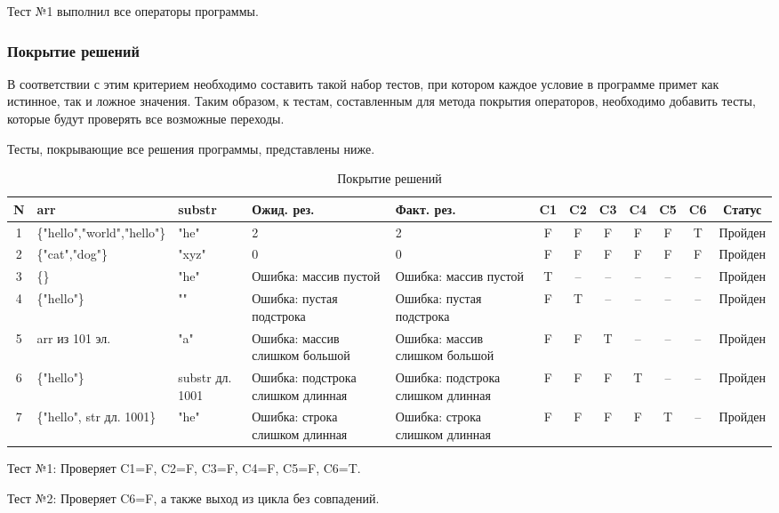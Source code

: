 \documentclass{article}[14pt]
\begin{document}
Тест №1 выполнил все операторы программы.

\subsubsection{Покрытие решений}

В соответствии с этим критерием необходимо составить такой набор тестов, при
котором каждое условие в программе примет как истинное, так и ложное значения.
Таким образом, к тестам, составленным для метода покрытия операторов, необходимо добавить тесты, которые будут проверять все возможные переходы.

Тесты, покрывающие все решения программы, представлены ниже.

\begin{table}[h!]
\centering
\caption{Покрытие решений}
\begin{tabularx}{\textwidth}{|c|X|X|X|X|c|c|c|c|c|c|c|}
\hline
\textbf{N} & \textbf{arr} & \textbf{substr} & \textbf{Ожид. рез.} & \textbf{Факт. рез.} & \textbf{C1} & \textbf{C2} & \textbf{C3} & \textbf{C4} & \textbf{C5} & \textbf{C6} & \textbf{Статус} \\
\hline
1 & \{"hello","world","hello"\} & "he" & 2 & 2 & F & F & F & F & F & T & Пройден \\
\hline
2 & \{"cat","dog"\} & "xyz" & 0 & 0 & F & F & F & F & F & F & Пройден \\
\hline
3 & \{\} & "he" & Ошибка: массив пустой & Ошибка: массив пустой & T & -- & -- & -- & -- & -- & Пройден \\
\hline
4 & \{"hello"\} & "" & Ошибка: пустая подстрока & Ошибка: пустая подстрока & F & T & -- & -- & -- & -- & Пройден \\
\hline
5 & arr из 101 эл. & "a" & Ошибка: массив слишком большой & Ошибка: массив слишком большой & F & F & T & -- & -- & -- & Пройден \\
\hline
6 & \{"hello"\} & substr дл. 1001 & Ошибка: подстрока слишком длинная & Ошибка: подстрока слишком длинная & F & F & F & T & -- & -- & Пройден \\
\hline
7 & \{"hello", str дл. 1001\} & "he" & Ошибка: строка слишком длинная & Ошибка: строка слишком длинная & F & F & F & F & T & -- & Пройден \\
\hline
\end{tabularx}
\end{table}

Тест №1: Проверяет C1=F, C2=F, C3=F, C4=F, C5=F, C6=T.

Тест №2: Проверяет C6=F, а также выход из цикла без совпадений.
\end{document}
